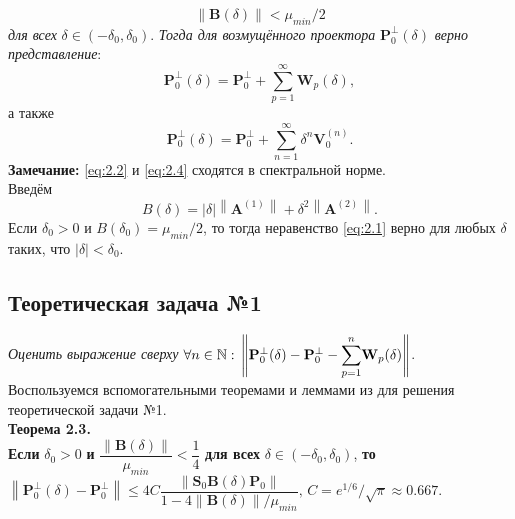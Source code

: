 \documentclass[fleqn]{article}
\newcommand\norm[1]{\left\|#1\right\|}
\renewcommand\b[1]{\mathbf{#1}}
\begin{document}
		\begin{equation}\label{eq:2.1}
			\norm{\textbf{B}(\delta)}<\mu_{min}/2
		\end{equation}
		\emph{для всех }$\delta\in(-\delta_0,\delta_0)$. \emph{Тогда для возмущённого проектора} $\textbf{P}_0^\bot(\delta)$ \emph{верно представление}:
		\begin{equation}\label{eq:2.2}
			\textbf{P}_0^\bot(\delta)=\textbf{P}_0^\bot + \sum_{p=1}^\infty\textbf{W}_p(\delta),
		\end{equation}
		а также
		\begin{equation}\label{eq:2.4}
			\textbf{P}_0^\bot(\delta) = \textbf{P}_0^\bot + \sum_{n=1}^\infty\delta^n\textbf{V}_0^{(n)}.
		\end{equation}
		\textbf{Замечание:} \eqref{eq:2.2} и \eqref{eq:2.4} сходятся в спектральной норме.\\
		Введём
 		\begin{equation}
			B(\delta) = |\delta|\norm{\textbf{A}^{(1)}}+\delta^2\norm{\textbf{A}^{(2)}}.
		\end{equation}
		Если $\delta_0>0$ и $B(\delta_0)=\mu_{min}/2$, то тогда неравенство \eqref{eq:2.1} верно для любых $\delta$ таких, что $|\delta|<\delta_0$.
	\subsection{Теоретическая задача №1}
	\emph{Оценить выражение сверху }$\forall n\in\mathbb{N}:\,\norm{\b{P}_0^\bot(\delta) - \b{P}_0^\bot - \mathlarger{\sum}\limits^n_{p=1}\b{W}_p(\delta)}$.\\
	Воспользуемся вспомогательными теоремами и леммами из \cite{nekrutkin2010perturbation} для решения теоретической задачи №1.
	\vspace*{\baselineskip}
	\\\textbf{Теорема 2.3.}\\\textbf{Если} $\delta_0 > 0$ \textbf{и} $\dfrac{\norm{\b{B}(\delta)}}{\mu_{min}} < \dfrac{1}{4}$ \textbf{для всех} $\delta \in (-\delta_0, \delta_0)$, \textbf{то} $\norm{\b{P}_0^\bot(\delta) - \b{P}_0^\bot} \leqslant 4C\dfrac{\norm{\b{S}_0\b{B}(\delta)\b{P}_0}}{1 - 4\norm{\b{B}(\delta)}/\mu_{min}},\,C = e^{1/6}/\sqrt{\pi}\approx0.667$.
\end{document}
